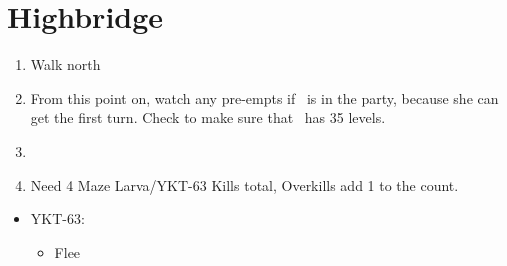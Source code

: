 \chapter{Highbridge}
\begin{spheregrid}
	\begin{itemize}
		\yunaf
	\end{itemize}
\end{spheregrid}
\begin{enumerate}
	\item Walk north
	\item From this point on, watch any pre-empts if \yuna\ is in the party, because she can get the first turn. Check to make sure that \lulu\ has 35 levels.
	\item \formation{\tidus}{\yuna}{\auron}
	\item Need 4 Maze Larva/YKT-63 Kills total, Overkills add 1 to the count.
\end{enumerate}
\bothvfill
\winvfill
\begin{encounters}
	\begin{itemize}
		\item YKT-63:
		      \begin{itemize}
			      \tidusf Attack
			      \yunaf Attack
			      \item Flee
		      \end{itemize}
	\end{itemize}
\end{encounters}
